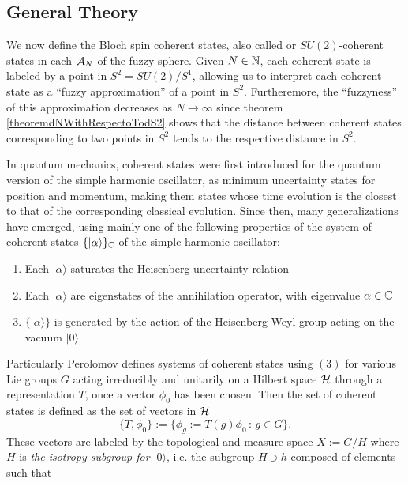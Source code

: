 \subsection{General Theory}

We now define the Bloch spin coherent states, also called or $SU(2)$-coherent states in each $\mathcal A_N$ of the fuzzy sphere. Given $N \in \mathbb{N}$, each coherent state is labeled by a point in $S^2 = SU(2) / S^1$, allowing us to interpret each coherent state as a ``fuzzy approximation'' of a point in $S^2$. Furtheremore, the ``fuzzyness'' of this approximation decreases as $N \to \infty$ since theorem \ref{theoremdNWithRespectoTodS2} shows that the distance between coherent states corresponding to two points in $S^2$ tends to the respective distance in $S^2$.

In quantum mechanics, coherent states were first introduced for the quantum version of the simple harmonic oscillator, as minimum uncertainty states for position and momentum, making them states whose time evolution is the closest to that of the corresponding classical evolution. Since then, many generalizations have emerged, using mainly one of the following properties of the system of coherent states $\{|\alpha\rangle\}_{\mathbb{C}}$ of the simple harmonic oscillator:
    \begin{enumerate}
        
    \item Each $|\alpha\rangle$ saturates the Heisenberg uncertainty relation
    
    \item Each $|\alpha\rangle$ are eigenstates of the annihilation operator, with eigenvalue $\alpha \in \mathbb{C}$
    
    \item $\{|\alpha\rangle\}$ is generated by the action of the Heisenberg-Weyl group acting on the vacuum $|0\rangle$
        
    \end{enumerate}
Particularly Perolomov \cite{Perelomov} defines systems of coherent states using $(3)$ for various Lie groups $G$ acting irreducibly and unitarily on a Hilbert space $\mathcal H$ through a representation $T$, once a vector $\phi_0$ has been chosen. Then the set of coherent states is defined as the set of vectors in $\mathcal H$ 
\begin{equation}
    \{ T, \phi_0\} := \{\phi_g := T(g) \phi_0 \,:\, g \in G\}.
\end{equation}
These vectors are labeled by the topological and measure space $X := G/H$ where $H$ is \emph{the isotropy subgroup for $|0\rangle$}, i.e. the subgroup $H \ni h$ composed of elements such that
